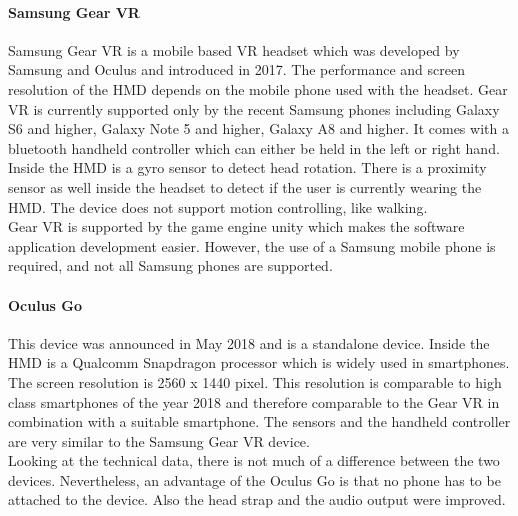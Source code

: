 \paragraph{Samsung Gear VR} Samsung Gear VR is a mobile based VR headset which was developed by Samsung and Oculus and introduced in 2017. The performance and screen resolution of the HMD depends on the mobile phone used with the headset. Gear VR is currently supported only by the recent Samsung phones including Galaxy S6 and higher, Galaxy Note 5 and higher, Galaxy A8 and higher.
It comes with a bluetooth handheld controller which can either be held in the left or right hand. Inside the HMD is a gyro sensor to detect head rotation. There is a proximity sensor as well inside the headset to detect if the user is currently wearing the HMD. The device does not support motion controlling, like walking. \cite{Samsung.2019}\\
Gear VR is supported by the game engine unity which makes the software application development easier. However, the use of a Samsung mobile phone is required, and not all Samsung phones are supported.
\paragraph{Oculus Go}
This device was announced in May 2018 and is a standalone device.
Inside the HMD is a Qualcomm Snapdragon processor which is widely used in smartphones. The screen resolution is  2560 x 1440 pixel. This resolution is comparable to high class smartphones of the year 2018 and therefore comparable to the Gear VR in combination with a suitable smartphone. The sensors and the handheld controller are very similar to the Samsung Gear VR device.\\
Looking at the technical data, there is not much of a difference between the two devices. Nevertheless, an advantage of the Oculus Go is that no phone has to be attached to the device. Also the head strap and the audio output were improved.\cite{Robertson.2018}

